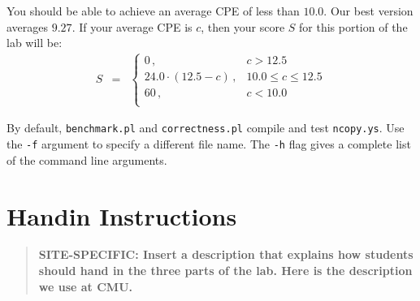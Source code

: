 \documentclass[11pt]{article}
\begin{document}
\begin{itemize}
You should be able to achieve an average CPE of less than $10.0$.
Our best version averages $9.27$.
If your average CPE is $c$, then your score $S$ for this portion of the
lab will be:
\begin{eqnarray*}
S & = & \left \{ \begin{array}{ll}
0\,, &  c > 12.5 \\
24.0 \cdot (12.5 - c)\,, & 10.0 \leq c \leq 12.5 \\
60\,, &  c < 10.0 \\
\end{array}
\right .
\end{eqnarray*}

By default, {\tt benchmark.pl} and {\tt correctness.pl} compile and
test {\tt ncopy.ys}. Use the {\tt -f} argument to specify a different
file name.  The {\tt -h} flag gives a complete list of the command
line arguments.

\end{itemize}


\section{Handin Instructions}

\begin{quote}
\bf SITE-SPECIFIC: Insert a description that explains how students
should hand in the three parts of the lab.  Here is the description
we use at CMU.
\end{quote}
\end{document}
